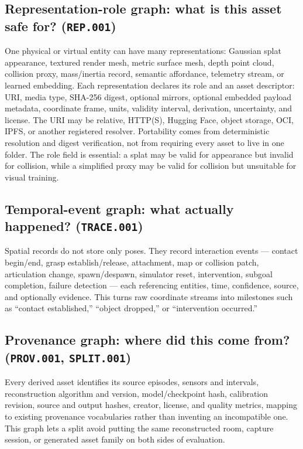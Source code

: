 \subsection{Representation-role graph: what is this asset safe for? (\texttt{REP.001})}

One physical or virtual entity can have many representations: Gaussian splat appearance, textured
render mesh, metric surface mesh, depth point cloud, collision proxy, mass/inertia record, semantic
affordance, telemetry stream, or learned embedding. Each representation declares its role and an
asset descriptor: URI, media type, SHA-256 digest, optional mirrors, optional embedded payload
metadata, coordinate frame, units, validity interval, derivation, uncertainty, and license. The URI
may be relative, HTTP(S), Hugging Face, object storage, OCI, IPFS, or another registered resolver.
Portability comes from deterministic resolution and digest verification, not from requiring every
asset to live in one folder. The role field is essential: a splat may be valid for appearance but
invalid for collision, while a simplified proxy may be valid for collision but unsuitable for visual
training.

\subsection{Temporal-event graph: what actually happened? (\texttt{TRACE.001})}

Spatial records do not store only poses. They record interaction events --- contact begin/end,
grasp establish/release, attachment, map or collision patch, articulation change, spawn/despawn,
simulator reset, intervention, subgoal completion, failure detection --- each referencing entities,
time, confidence, source, and optionally evidence. This turns raw coordinate streams into
milestones such as ``contact established,'' ``object dropped,'' or ``intervention occurred.''

\subsection{Provenance graph: where did this come from? (\texttt{PROV.001}, \texttt{SPLIT.001})}

Every derived asset identifies its source episodes, sensors and intervals, reconstruction algorithm
and version, model/checkpoint hash, calibration revision, source and output hashes, creator,
license, and quality metrics, mapping to existing provenance vocabularies rather than inventing an
incompatible one. This graph lets a split avoid putting the same reconstructed room, capture
session, or generated asset family on both sides of evaluation.
